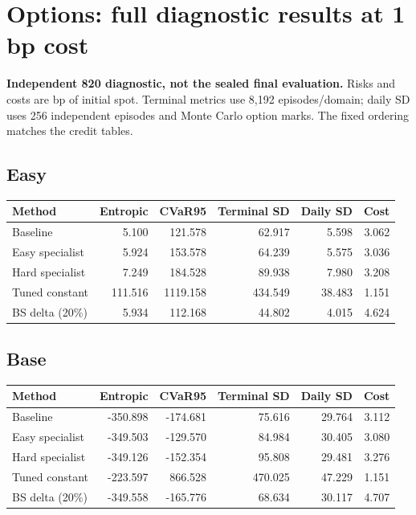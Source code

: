 \documentclass[11pt,a4paper]{article}
\begin{document}
\section{Options: full diagnostic results at 1 bp cost}
\textbf{Independent 820 diagnostic, not the sealed final evaluation.} Risks and costs are bp of initial spot. Terminal metrics use 8,192 episodes/domain; daily SD uses 256 independent episodes and Monte Carlo option marks. The fixed ordering matches the credit tables.

\subsection*{Easy}
\begin{small}
\begin{tabular}{lrrrrr}
\toprule
Method & Entropic & CVaR95 & Terminal SD & Daily SD & Cost \\
\midrule
Baseline & 5.100 & 121.578 & 62.917 & 5.598 & 3.062 \\
Easy specialist & 5.924 & 153.578 & 64.239 & 5.575 & 3.036 \\
Hard specialist & 7.249 & 184.528 & 89.938 & 7.980 & 3.208 \\
Tuned constant & 111.516 & 1119.158 & 434.549 & 38.483 & 1.151 \\
BS delta (20\%) & 5.934 & 112.168 & 44.802 & 4.015 & 4.624 \\
\bottomrule
\end{tabular}
\end{small}\par\medskip

\subsection*{Base}
\begin{small}
\begin{tabular}{lrrrrr}
\toprule
Method & Entropic & CVaR95 & Terminal SD & Daily SD & Cost \\
\midrule
Baseline & -350.898 & -174.681 & 75.616 & 29.764 & 3.112 \\
Easy specialist & -349.503 & -129.570 & 84.984 & 30.405 & 3.080 \\
Hard specialist & -349.126 & -152.354 & 95.808 & 29.481 & 3.276 \\
Tuned constant & -223.597 & 866.528 & 470.025 & 47.229 & 1.151 \\
BS delta (20\%) & -349.558 & -165.776 & 68.634 & 30.117 & 4.707 \\
\bottomrule
\end{tabular}
\end{small}\par\medskip
\end{document}
